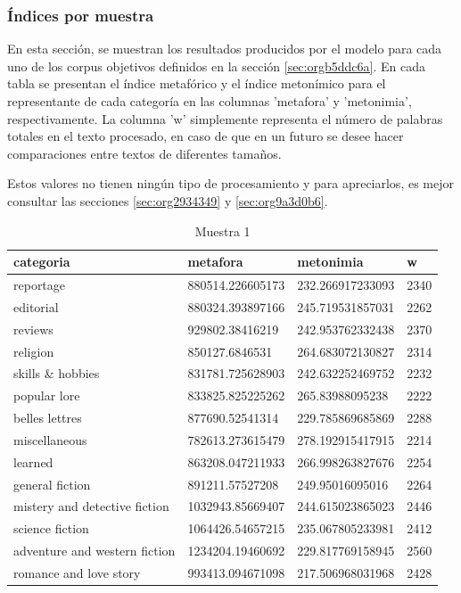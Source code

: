 \documentclass[12pt,letterpaper,twoside]{article}
\begin{document}
\subsubsection{Índices por muestra}
\label{sec:org6d12565}
En esta sección, se muestran los resultados producidos por el modelo
para cada uno de los corpus objetivos definidos en la sección
\ref{sec:orgb5ddc6a}. En cada tabla se presentan el índice
metafórico y el índice metonímico para el representante de cada
categoría en las columnas 'metafora' y 'metonimia',
respectivamente. La columna 'w' simplemente representa el número de
palabras totales en el texto procesado, en caso de que en un futuro se
desee hacer comparaciones entre textos de diferentes tamaños.

Estos valores no tienen ningún tipo de procesamiento y para apreciarlos, es mejor
consultar las secciones \ref{sec:org2934349} y \ref{sec:org9a3d0b6}.

\small
\begin{center}
    \begin{longtable}{| p{} | p{} | p{}|p{}|}
    \caption{Muestra 1}
    \hline
        categoria & metafora & metonimia & w \\ \hline
        reportage & 880514.226605173 & 232.266917233093 & 2340 \\ \hline
        editorial & 880324.393897166 & 245.719531857031 & 2262 \\ \hline
        reviews & 929802.38416219 & 242.953762332438 & 2370 \\ \hline
        religion & 850127.6846531 & 264.683072130827 & 2314 \\ \hline
        skills \& hobbies & 831781.725628903 & 242.632252469752 & 2232 \\ \hline
        popular lore & 833825.825225262 & 265.83988095238 & 2222 \\ \hline
        belles lettres & 877690.52541314 & 229.785869685869 & 2288 \\ \hline
        miscellaneous & 782613.273615479 & 278.192915417915 & 2214 \\ \hline
        learned & 863208.047211933 & 266.998263827676 & 2254 \\ \hline
        general fiction & 891211.57527208 & 249.95016095016 & 2264 \\ \hline
        mistery and detective fiction & 1032943.85669407 & 244.615023865023 & 2446 \\ \hline
        science fiction & 1064426.54657215 & 235.067805233981 & 2412 \\ \hline
        adventure and western fiction & 1234204.19460692 & 229.817769158945 & 2560 \\ \hline
        romance and love story & 993413.094671098 & 217.506968031968 & 2428 \\ \hline
\end{longtable}
\label{muestra1}
\end{center}
\end{document}
